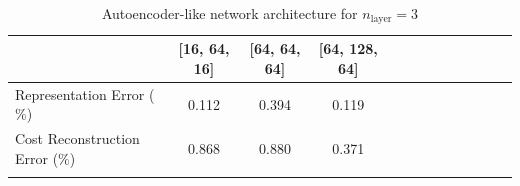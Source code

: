 \begin{table}[!ht]
\small
\centering
\begin{tabular}{ccccccccccccc}
\Xhline{3\arrayrulewidth}
\multicolumn{1}{l|}{Network Architecture}           & [16, 64, 16]  & [64, 64, 64] & [64, 128, 64]                           \\ \hline
\multicolumn{1}{l|}{Representation Error ($\%$)} & 0.112 & 0.394 & 0.119 \\ \hline   
\multicolumn{1}{l|}{Cost Reconstruction Error ($\%$)} & 0.868 & 0.880 & 0.371 \\ \Xhline{3\arrayrulewidth}

\end{tabular}
\caption{Autoencoder-like network architecture for $n_{\text{layer}}=3$}
\label{tab:n_layer = 3}
\end{table}